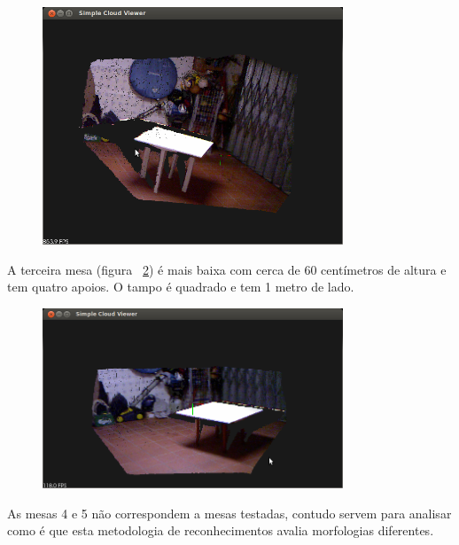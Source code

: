 \begin{figure}[htb]
\begin{center}
	\includegraphics[width=0.80\textwidth]{figures/mesa2.png}
	\label{fig:mesa2}
\end{center}
\end{figure}

A terceira mesa (figura ~\ref{fig:mesa3}) é mais baixa com cerca de 60 centímetros de altura e tem quatro apoios. O tampo é quadrado e tem 1 metro de lado.

\begin{figure}[htb]
\begin{center}
	\includegraphics[width=0.80\textwidth]{figures/mesa3.png}
	\label{fig:mesa3}
\end{center}
\end{figure}

As mesas 4 e 5 não correspondem a mesas testadas, contudo servem para analisar como é que esta metodologia de reconhecimentos avalia morfologias diferentes.


